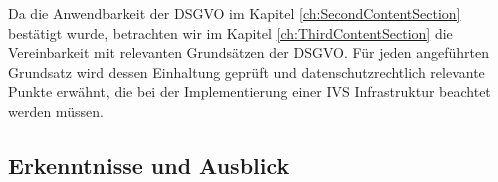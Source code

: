 Da die Anwendbarkeit der DSGVO im Kapitel \ref{ch:SecondContentSection} bestätigt wurde, betrachten wir im Kapitel \ref{ch:ThirdContentSection} die Vereinbarkeit mit relevanten Grundsätzen der DSGVO. Für jeden angeführten Grundsatz wird dessen Einhaltung geprüft und datenschutzrechtlich relevante Punkte erwähnt, die bei der Implementierung einer IVS Infrastruktur beachtet werden müssen.


\subsection{Erkenntnisse und Ausblick}

